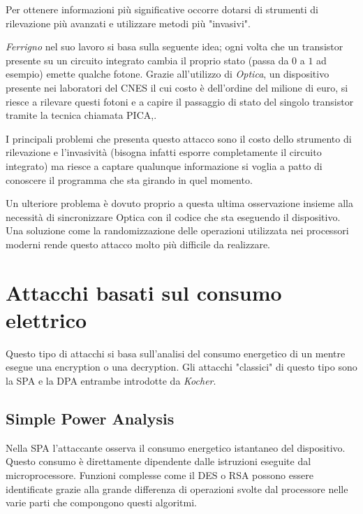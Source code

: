 		Per ottenere informazioni più significative occorre dotarsi di strumenti di rilevazione più avanzati e utilizzare metodi più "invasivi".
		
		\emph{Ferrigno} nel suo lavoro\cite{ferrigno2008aes} si basa sulla seguente idea; ogni volta che un transistor presente su un circuito integrato cambia il proprio stato (passa da $0$ a $1$ ad esempio) emette qualche fotone. Grazie all'utilizzo di \emph{Optica}, un dispositivo presente nei laboratori del \ac{CNES} il cui costo è dell'ordine del milione di euro, si riesce a rilevare questi fotoni e a capire il passaggio di stato del singolo transistor tramite la tecnica chiamata \ac{PICA}\cite{tsang2000picosecond},.
		
		I principali problemi che presenta questo attacco sono il costo dello strumento di rilevazione e l'invasività (bisogna infatti esporre completamente il circuito integrato) ma riesce a captare qualunque informazione si voglia a patto di conoscere il programma che sta girando in quel momento.
		
		Un ulteriore problema è dovuto proprio a questa ultima osservazione insieme alla necessità di sincronizzare Optica con il codice che sta eseguendo il dispositivo. Una soluzione come la randomizzazione delle operazioni utilizzata nei processori moderni rende questo attacco molto più difficile da realizzare.
			
	\section{Attacchi basati sul consumo elettrico}
		Questo tipo di attacchi si basa sull'analisi del consumo energetico di un \disps mentre esegue una encryption o una decryption. Gli attacchi "classici" di questo tipo sono la \ac{SPA} e la \ac{DPA} entrambe introdotte da \emph{Kocher}\cite{kocher2011introduction}.
		
		\subsection{Simple Power Analysis}
		Nella \ac{SPA} l'attaccante osserva il consumo energetico istantaneo del dispositivo. Questo consumo è direttamente dipendente dalle istruzioni eseguite dal microprocessore. Funzioni complesse come il \ac{DES} o RSA possono essere identificate grazie alla grande differenza di operazioni svolte dal processore nelle varie parti che compongono questi algoritmi. 
		
